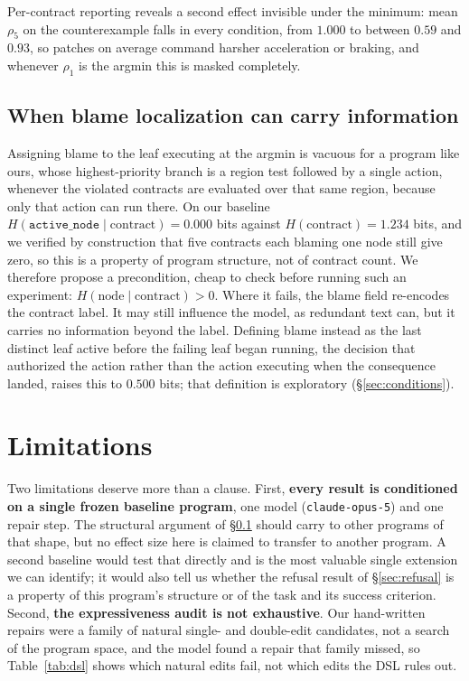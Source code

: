 \documentclass{article}
\newcommand{\rhoc}[1]{\rho_{#1}}
\newcommand{\Hnc}{H(\mathrm{node}\mid\mathrm{contract})}
\begin{document}
Per-contract reporting reveals a second effect invisible under the minimum:
mean $\rhoc{5}$ on the counterexample falls in every condition, from $1.000$ to
between $0.59$ and $0.93$, so patches on average command harsher acceleration or
braking, and whenever $\rhoc{1}$ is the argmin this is masked completely.

\subsection{When blame localization can carry information}
\label{sec:blame}

Assigning blame to the leaf executing at the argmin is vacuous for a program like
ours, whose highest-priority branch is a region test followed by a single action,
whenever the violated contracts are evaluated over that same region, because only
that action can run there. On our baseline $H(\texttt{active\_node} \mid \text{contract}) =
0.000$ bits against $H(\text{contract}) = 1.234$ bits, and we verified by
construction that five contracts each blaming one node still give zero, so this
is a property of program structure, not of contract count. We therefore propose a
precondition, cheap to check before running such an experiment: $\Hnc > 0$.
Where it fails, the blame field re-encodes the contract label. It may still
influence the model, as redundant text can, but it carries no information beyond
the label. Defining blame instead as the last distinct leaf active before the
failing leaf began running, the decision that authorized the action rather than
the action executing when the consequence landed, raises this to $0.500$ bits;
that definition is exploratory (\S\ref{sec:conditions}).

\section{Limitations}
\label{sec:limitations}

Two limitations deserve more than a clause. First, \textbf{every result is
conditioned on a single frozen baseline program}, one model
(\texttt{claude-opus-5}) and one repair step. The structural argument of
\S\ref{sec:blame} should carry to other programs of that shape, but no effect size
here is claimed to transfer to another program. A second baseline would test that
directly and is the most valuable single extension we can identify; it would also
tell us whether the refusal result of \S\ref{sec:refusal} is a property of this
program's structure or of the task and its success criterion.
Second, \textbf{the expressiveness audit is not exhaustive}. Our hand-written
repairs were a family of natural single- and double-edit candidates, not a search
of the program space, and the model found a repair that family missed, so
Table~\ref{tab:dsl} shows which natural edits fail, not which edits the DSL rules
out.
\end{document}
